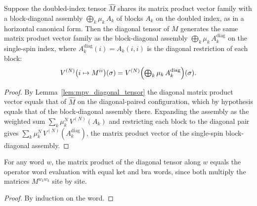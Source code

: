 \begin{lemma}
    \label{lem:mpv_diagonal_tensor_eq_blocks}
    \leanok
    Suppose the doubled-index tensor $\widehat{M}$ shares its matrix product vector
    family with a block-diagonal assembly $\bigoplus_k \mu_k\, A_k$ of blocks $A_k$ on
    the doubled index, as in a horizontal canonical form. Then the diagonal tensor of
    $M$ generates the same matrix product vector family as the block-diagonal assembly
    $\bigoplus_k \mu_k\, A_k^{\mathrm{diag}}$ on the single-spin index, where
    $A_k^{\mathrm{diag}}(i) = A_k(i,i)$ is the diagonal restriction of each block:
    \[
        V^{(N)}\bigl(i\mapsto M^{ii}\bigr)(\sigma)
        = V^{(N)}\Bigl(\textstyle\bigoplus_k \mu_k\, A_k^{\mathrm{diag}}\Bigr)(\sigma).
    \]
\end{lemma}
\begin{proof}\leanok
    By Lemma~\ref{lem:mpv_diagonal_tensor} the diagonal matrix product vector equals
    that of $\widehat{M}$ on the diagonal-paired configuration, which by hypothesis
    equals that of the block-diagonal assembly there. Expanding the assembly as the
    weighted sum $\sum_k \mu_k^N\, V^{(N)}(A_k)$ and restricting each block to the
    diagonal pair gives $\sum_k \mu_k^N\, V^{(N)}(A_k^{\mathrm{diag}})$, the matrix
    product vector of the single-spin block-diagonal assembly.
\end{proof}

\begin{lemma}
    \label{lem:eval_word_diagonal_tensor}
    \leanok
    For any word $w$, the matrix product of the diagonal tensor along $w$ equals the
    operator word evaluation with equal ket and bra words, since both multiply the
    matrices $M^{w_k w_k}$ site by site.
\end{lemma}
\begin{proof}\leanok
    By induction on the word.
\end{proof}

